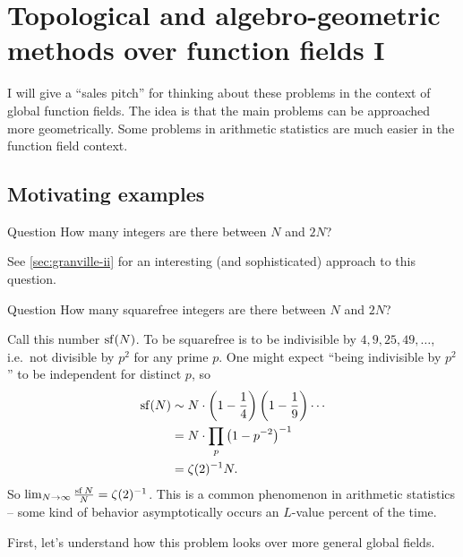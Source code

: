 
\section{Topological and algebro-geometric methods over function fields I}\label{sec:ellenberg-i}





I will give a ``sales pitch'' for thinking about these problems in the context 
of global function fields. The idea is that the main problems can be approached 
more geometrically. Some problems in arithmetic statistics are much easier in 
the function field context. 





\subsection{Motivating examples}

\begin{enonce}{Question}
How many integers are there between $N$ and $2 N$?
\end{enonce}

See \autoref{sec:granville-ii} for an interesting (and sophisticated) approach 
to this question. 

\begin{enonce}{Question}
How many squarefree integers are there between $N$ and $2 N$?
\end{enonce}

Call this number $\operatorname{sf}(N)$. To be squarefree is to be indivisible by 
$4,9,25,49,\ldots$, i.e.~not divisible by $p^2$ for any prime $p$. One might 
expect ``being indivisible by $p^2$'' to be independent for distinct $p$, so 
\begin{align*}
  \operatorname{sf}(N) 
    &\sim N\cdot\left(1-\frac 1 4\right)\left(1-\frac 1 9\right) \cdots \\
    &= N\cdot \prod_p \left(1-p^{-2}\right)^{-1} \\
    &= \zeta(2)^{-1} N .
\end{align*}
So $\lim_{N\to \infty}\frac{\operatorname{sf}{N}}{N} = \zeta(2)^{-1}$. This is a 
common phenomenon in arithmetic statistics -- some kind of behavior 
asymptotically occurs an $L$-value percent of the time. 

First, let's understand how this problem looks over more general global fields. 

